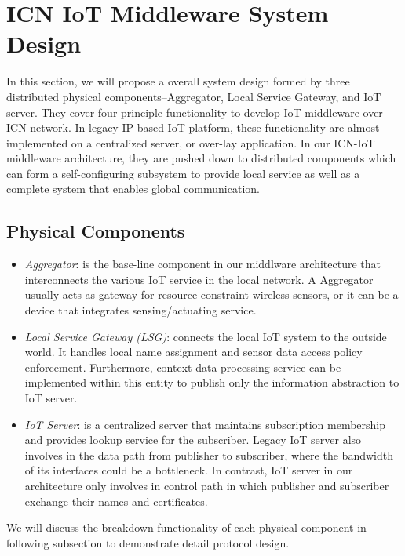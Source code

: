 \section{ICN IoT Middleware System Design}
In this section, we will propose a overall system design formed by three distributed physical components--Aggregator, Local Service Gateway, and IoT server. They cover four principle functionality to develop IoT middleware over ICN network. In legacy IP-based IoT platform, these functionality are almost implemented on a centralized server, or over-lay application. In our ICN-IoT middleware architecture, they are pushed down to distributed components which can form a self-configuring subsystem to provide local service as well as a complete system that enables global communication. 
\subsection{Physical Components}\label{sec:physical}
\begin{itemize}
\vspace{-2pt}\item{\em Aggregator}:
is the base-line component in our middlware architecture that interconnects the various IoT service in the local network. A Aggregator usually acts as gateway for resource-constraint wireless sensors, or it can be a device that integrates sensing/actuating service. 
\vspace{-2pt}\item{\em Local Service Gateway (LSG)}:
connects the local IoT system to the outside world. It handles local name assignment and sensor data access policy enforcement. Furthermore, context data processing service can be implemented within this entity to publish only the information abstraction to IoT server.    
\vspace{-2pt}\item{\em IoT Server}:
is a centralized server that maintains subscription membership and provides lookup service for the subscriber. Legacy IoT server also involves in the data path from publisher to subscriber, where the bandwidth of its interfaces could be a bottleneck. In contrast, IoT server in our architecture only involves in control path in which publisher and subscriber exchange their names and certificates.  
\end{itemize}

We will discuss the breakdown functionality of each  physical component in following subsection to demonstrate detail protocol design.
